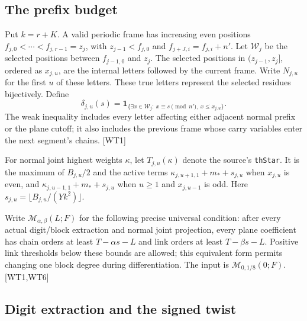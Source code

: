 \documentclass[11pt,a4paper]{article}
\numberwithin{equation}{section}
\theoremstyle{remark}\newtheorem{remark}[theorem]{Remark}
\begin{document}
\subsection{The prefix budget}

Put $k=r+K$. A valid periodic frame has increasing even positions
$f_{j,0}<\cdots<f_{j,r-1}=z_j$, with
$z_{j-1}<f_{j,0}$ and $f_{j+J,i}=f_{j,i}+n'$.
Let $\mathcal W_j$ be the selected positions between $f_{j-1,0}$ and $z_j$.
The selected positions in $(z_{j-1},z_j]$, ordered as $x_{j,u}$,
are the internal letters followed by the current frame. Write $N_{j,u}$
for the first $u$ of these letters. These true letters represent the selected
residues bijectively. Define
\[
 \delta_{j,u}(s)=
 \mathbf1_{\{\exists x\in\mathcal W_j:\ x\equiv s\pmod {n'},\ x\le x_{j,u}\}}.
 \tag{WT.1}
\]
The weak inequality includes every letter affecting either adjacent
normal prefix or the plane cutoff; it also includes the previous frame
whose carry variables enter the next segment's chains. \textsf{[WT1]}\cite{incoming-words}

For normal joint highest weights $\kappa$, let $T_{j,u}(\kappa)$ denote
the source's \texttt{thStar}. It is the maximum of $B_{j,u}/2$ and the
active terms
$\kappa_{j,u+1,1}+m_*+s_{j,u}$ when $x_{j,u}$ is even, and
$\kappa_{j,u-1,1}+m_*+s_{j,u}$ when $u\ge1$ and $x_{j,u-1}$ is odd.
Here $s_{j,u}=\lfloor B_{j,u}/(Yk^2)\rfloor$.

Write $\mathcal M_{\alpha,\beta}(L;F)$ for the following precise universal
condition: after every actual digit/block extraction and normal joint
projection, every plane coefficient has chain orders at least
$T-\alpha s-L$ and link orders at least $T-\beta s-L$.
Positive link thresholds below these bounds are allowed; this equivalent
form permits changing one block degree during differentiation.
The input is $\mathcal M_{0,1/8}(0;F)$. \textsf{[WT1,WT6]}

\subsection{Digit extraction and the signed twist}
\end{document}
